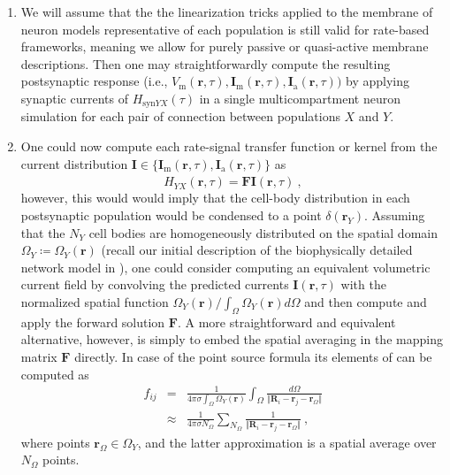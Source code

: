 \begin{enumerate}
\item We will assume that the the linearization tricks applied to the membrane of neuron models representative of each population   is still valid for rate-based frameworks, 
meaning we allow for purely passive or quasi-active membrane descriptions. 
Then one may straightforwardly compute the resulting postsynaptic response 
(i.e., $V_\mathrm{m}(\mathbf{r}, \tau), \mathbf{I}_\mathrm{m}(\mathbf{r}, \tau), \mathbf{I}_\mathrm{a}(\mathbf{r}, \tau))$ 
by applying synaptic currents of $H_{\mathrm{syn}YX}(\tau)$ in a single multicompartment neuron simulation for each pair of connection between populations $X$ and $Y$. 

\item One could now compute each rate-signal transfer function or kernel from the current distribution 
$\mathbf{I} \in \{ \mathbf{I}_\mathrm{m}(\mathbf{r}, \tau), \mathbf{I}_\mathrm{a}(\mathbf{r}, \tau) \}$ as
\begin{equation}
\hat{H}_{YX}(\mathbf{r}, \tau) = \mathbf{F}\mathbf{I}(\mathbf{r}, \tau) ~,
\end{equation}
however, this would would imply that the cell-body distribution in each postsynaptic population would be condensed to a point $\delta(\mathbf{r}_Y)$. 
Assuming that the $N_Y$ cell bodies are homogeneously distributed on the spatial domain $\Omega_Y \coloneq \Omega_Y(\mathbf{r})$ 
(recall our initial description of the biophysically detailed network model in ), 
one could consider computing an equivalent volumetric current field by convolving the predicted currents $\mathbf{I}(\mathbf{r}, \tau)$ with the normalized spatial function 
$\Omega_Y(\mathbf{r}) / \int_\Omega \Omega_Y(\mathbf{r}) d\Omega$ 
and then compute and apply the forward solution $\mathbf{F}$.  
A more straightforward and equivalent alternative, however, 
is simply to embed the spatial averaging in the mapping matrix $\mathbf{F}$ directly. 
In case of the point source formula its elements of can be computed as
\begin{eqnarray}
f_{ij} &=& \frac{1}{4 \pi \sigma \int_\Omega \Omega_Y(\mathbf{r})} 
	\int_\Omega \frac{d\Omega}{\Vert \mathbf{R}_i - \mathbf{r}_j - \mathbf{r}_\Omega \Vert} \\
&\approx& \frac{1}{4 \pi \sigma N_\Omega} 
	\sum_{N_\Omega} \frac{1}{\Vert \mathbf{R}_i - \mathbf{r}_j - \mathbf{r}_\Omega \Vert}~,
\end{eqnarray}
where points $\mathbf{r}_\Omega \in \Omega_Y$, 
and the latter approximation is a spatial average over $N_\Omega$ points. 


\end{enumerate}

